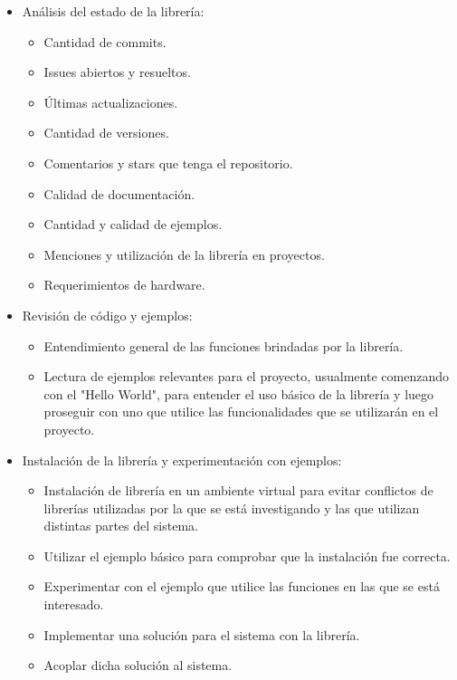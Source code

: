 \begin{itemize}

\item Análisis del estado de la librería:

	\begin{itemize}

	\item Cantidad de commits.
	\item Issues abiertos y resueltos.
	\item Últimas actualizaciones.
	\item Cantidad de versiones.
	\item Comentarios y stars que tenga el repositorio.
	\item Calidad de documentación.
	\item Cantidad y calidad de ejemplos.
	\item Menciones y utilización de la librería en proyectos.
	\item Requerimientos de hardware.

	\end{itemize}

\item Revisión de código y ejemplos:

	\begin{itemize}

		\item Entendimiento general de las funciones brindadas por la librería.
		\item Lectura de ejemplos relevantes para el proyecto, usualmente comenzando con el "Hello World", para entender el uso básico de la librería y luego proseguir con uno que utilice las funcionalidades que se utilizarán en el proyecto.

	\end{itemize}

\item Instalación de la librería y experimentación con ejemplos:

	\begin{itemize}

	\item Instalación de librería en un ambiente virtual para evitar conflictos de librerías utilizadas por la que se está investigando y las que utilizan distintas partes del sistema.
	\item Utilizar el ejemplo básico para comprobar que la instalación fue correcta.
	\item Experimentar con el ejemplo que utilice las funciones en las que se está interesado.
	\item Implementar una solución para el sistema con la librería.
	\item Acoplar dicha solución al sistema.

	\end{itemize}

\end{itemize}

